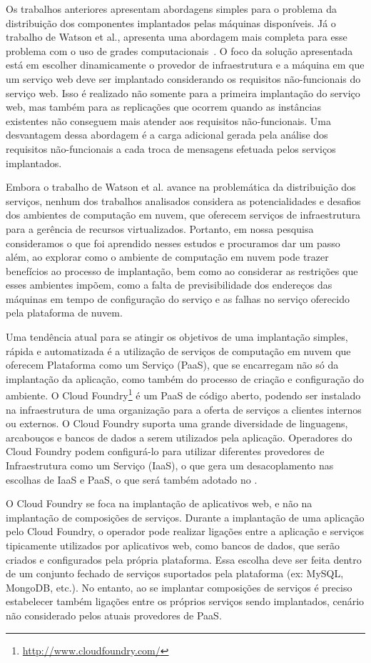 Os trabalhos anteriores apresentam abordagens simples para o problema da distribuição dos componentes implantados pelas máquinas disponíveis. Já o trabalho de Watson et al., apresenta uma abordagem mais completa para esse problema com o uso de grades computacionais~\cite{Watson2006Dynasoar}. O foco da solução apresentada está em escolher dinamicamente o provedor de infraestrutura e a máquina em que um serviço web deve ser implantado considerando os requisitos não-funcionais do serviço web. Isso é realizado não somente para a primeira implantação do serviço web, mas também para as replicações que ocorrem quando as instâncias existentes não conseguem mais atender aos requisitos não-funcionais. Uma desvantagem dessa abordagem é a carga adicional gerada pela análise dos requisitos não-funcionais a cada troca de mensagens efetuada pelos serviços implantados.

Embora o trabalho de Watson et al. avance na problemática da distribuição dos serviços, nenhum dos trabalhos analisados considera as potencialidades e desafios dos ambientes de computação em nuvem, que oferecem serviços de infraestrutura para a gerência de recursos virtualizados. Portanto, em nossa pesquisa consideramos o que foi aprendido nesses estudos e procuramos dar um passo além, ao explorar como o ambiente de computação em nuvem pode trazer benefícios ao processo de implantação, bem como ao considerar as restrições que esses ambientes impõem, como a falta de previsibilidade dos endereços das máquinas em tempo de configuração do serviço e as falhas no serviço oferecido pela plataforma de nuvem.

Uma tendência atual para se atingir os objetivos de uma implantação simples, rápida e automatizada é a utilização de serviços de computação em nuvem que oferecem Plataforma como um Serviço (PaaS), que se encarregam não só da implantação da aplicação, como também do processo de criação e configuração do ambiente. O Cloud Foundry\footnote{\url{http://www.cloudfoundry.com/}} é um PaaS de código aberto, podendo ser instalado na infraestrutura de uma organização para a oferta de serviços a clientes internos ou externos. O Cloud Foundry suporta uma grande diversidade de linguagens, arcabouços e bancos de dados a serem utilizados pela aplicação. Operadores do Cloud Foundry podem configurá-lo para utilizar diferentes provedores de Infraestrutura como um Serviço (IaaS), o que gera um desacoplamento nas escolhas de IaaS e PaaS, o que será também adotado no \ee.

O Cloud Foundry se foca na implantação de aplicativos web, e não na implantação de composições de serviços. Durante a implantação de uma aplicação pelo Cloud Foundry, o operador pode realizar ligações entre a aplicação e serviços tipicamente utilizados por aplicativos web, como bancos de dados, que serão criados e configurados pela própria plataforma. Essa escolha deve ser feita dentro de um conjunto fechado de serviços suportados pela plataforma (ex: MySQL, MongoDB, etc.). No entanto, ao se implantar composições de serviços é preciso estabelecer também ligações entre os próprios serviços sendo implantados, cenário não considerado pelos atuais provedores de PaaS.

